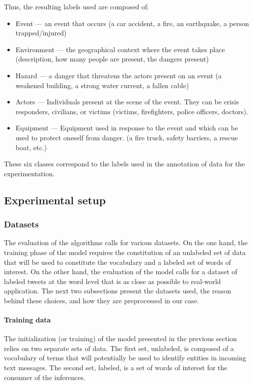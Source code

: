 Thus, the resulting labels used are composed of:

\begin{itemize}
    \item Event — an event that occurs (a car accident, a fire, an earthquake, a person trapped/injured)
    \item Environment — the geographical context where the event takes place (description, how many people are present, the dangers present)
    \item Hazard — a danger that threatens the actors present on an event (a weakened building, a strong water current, a fallen cable)
    \item Actors — Individuals present at the scene of the event. They can be crisis responders, civilians, or victims (victims, firefighters, police officers, doctors).
    \item Equipment — Equipment used in response to the event and which can be used to protect oneself from danger. (a fire truck, safety barriers, a rescue boat, etc.)
\end{itemize}

These six classes correspond to the labels used in the annotation of data for the experimentation.

\subsection{Experimental setup}
\subsubsection{Datasets}
The evaluation of the algorithms calls for various datasets.
On the one hand, the training phase of the model requires the constitution of an unlabeled set of data that will be used to constitute the vocabulary and a labeled set of words of interest.
On the other hand, the evaluation of the model calls for a dataset of labeled tweets at the word level that is as close as possible to real-world application.
The next two subsections present the datasets used, the reason behind these choices, and how they are preprocessed in our case.

\paragraph{Training data}
The initialization (or training) of the model presented in the previous section relies on two separate sets of data.
The first set, unlabeled, is composed of a vocabulary of terms that will potentially be used to identify entities in incoming text messages.
The second set, labeled, is a set of words of interest for the consumer of the inferences.


